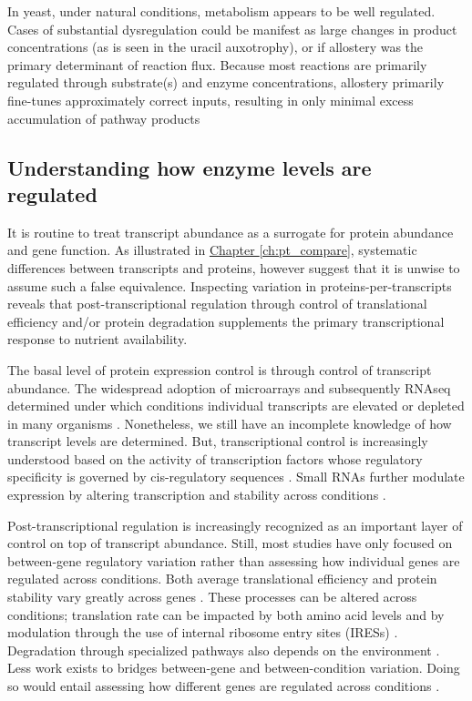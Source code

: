 In yeast, under natural conditions, metabolism appears to be well regulated. Cases of substantial dysregulation could be manifest as large changes in product concentrations (as is seen in the uracil auxotrophy), or if allostery was the primary determinant of reaction flux. Because most reactions are primarily regulated through substrate(s) and enzyme concentrations, allostery primarily fine-tunes approximately correct inputs, resulting in only minimal excess accumulation of pathway products

\subsection{Understanding how enzyme levels are regulated}

It is routine to treat transcript abundance as a surrogate for protein abundance and gene function. As illustrated in \hyperref[ch:pt_compare]{Chapter \ref{ch:pt_compare}}, systematic differences between transcripts and proteins, however suggest that it is unwise to assume such a false equivalence. Inspecting variation in proteins-per-transcripts reveals that post-transcriptional regulation through control of translational efficiency and/or protein degradation supplements the primary transcriptional response to nutrient availability. 

The basal level of protein expression control is through control of transcript abundance. The widespread adoption of microarrays and subsequently RNAseq determined under which conditions individual transcripts are elevated or depleted in many organisms \cite{Edgar:2002tt}. Nonetheless, we still have an incomplete knowledge of how transcript levels are determined. But, transcriptional control is increasingly understood based on the activity of transcription factors whose regulatory specificity is governed by cis-regulatory sequences \cite{Boorsma:2008cv, McIsaac:2012da}. Small RNAs further modulate expression by altering transcription and stability across conditions \cite{ValenciaSanchez:2006eb, Guo:2010tv}.

Post-transcriptional regulation is increasingly recognized as an important layer of control on top of transcript abundance. Still, most studies have only focused on between-gene regulatory variation rather than assessing how individual genes are regulated across conditions. Both average translational efficiency and protein stability vary greatly across genes \cite{Belle:2006hv, Ingolia:2011hu}. These processes can be altered across conditions;  translation rate can be impacted by both amino acid levels \cite{Klumpp:2009ic} and by modulation through the use of internal ribosome entry sites (IRESs) \cite{Hellen:2001cw}. Degradation through specialized pathways also depends on the environment \cite{Callis:1995ki}. Less work exists to bridges between-gene and between-condition variation. Doing so would entail assessing how different genes are regulated across conditions \cite{Brar:2012ig, Jovanovic:2015hp}. 

